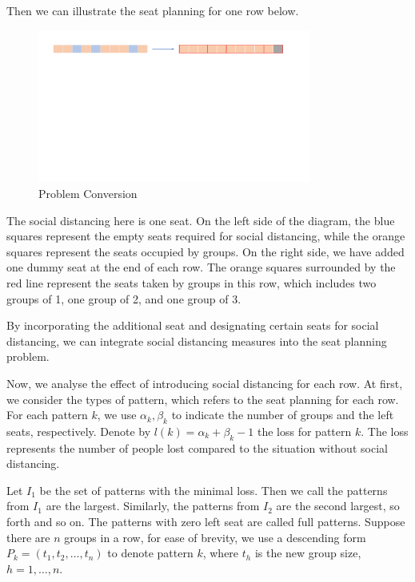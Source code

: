 Then we can illustrate the seat planning for one row below. 

\begin{figure}[ht]
    \centering
    \includegraphics[width = 0.8\textwidth]{./Figures/dummy_seat.pdf}
    \caption{Problem Conversion}
\end{figure}

The social distancing here is one seat. On the left side of the diagram, the blue squares represent the empty seats required for social distancing, while the orange squares represent the seats occupied by groups. On the right side, we have added one dummy seat at the end of each row. The orange squares surrounded by the red line represent the seats taken by groups in this row, which includes two groups of 1, one group of 2, and one group of 3.

By incorporating the additional seat and designating certain seats for social distancing, we can integrate social distancing measures into the seat planning problem.


Now, we analyse the effect of introducing social distancing for each row. At first, we consider the types of pattern, which refers to the seat planning for each row. For each pattern $k$, we use $\alpha_k, \beta_k$ to indicate the number of groups and the left seats, respectively. Denote by $l(k) = \alpha_k + \beta_k -1$ the loss for pattern $k$. The loss represents the number of people lost compared to the situation without social distancing.

Let $I_1$ be the set of patterns with the minimal loss. Then we call the patterns from $I_1$ are the largest. Similarly, the patterns from $I_2$ are the second largest, so forth and so on. The patterns with zero left seat are called full patterns. Suppose there are $n$ groups in a row, for ease of brevity, we use a descending form $P_{k} = (t_1, t_2, \ldots, t_n)$ to denote pattern $k$, where $t_h$ is the new group size, $h = 1,\ldots, n$.


